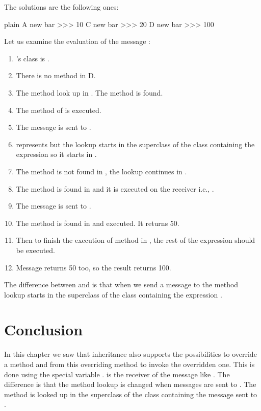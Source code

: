 \documentclass[10pt,twoside,english]{_support/latex/sbabook/sbabook}
\begin{document}
The solutions are the following ones:

\begin{displaycode}{plain}
A new bar
>>> 10
C new bar
>>> 20
D new bar
>>> 100
\end{displaycode}

Let us examine the evaluation of the message : 

\begin{enumerate}
\item {}'s class is .
\item There is no method  in D.
\item The method look up in . The method  is found.
\item The method  of  is executed.
\item The message  is sent to .
\item {} represents  but the lookup starts in the superclass of the class containing the expression  so it starts in .
\item The method  is not found in , the lookup continues in .
\item The method  is found in  and it is executed on the receiver i.e., .
\item The message  is sent to .
\item The method  is found in  and executed. It returns 50. 
\item Then to finish the execution of method  in , the rest of the expression  should be executed.
\item Message  returns 50 too, so the result returns 100. 
\end{enumerate}

\begin{important}
The difference between  and  is that when we send a message to  the method lookup starts in the superclass of the class containing the expression .
\end{important}
\section{Conclusion}
In this chapter we saw that inheritance also supports the possibilities to override a method and from this overriding method to invoke the overridden one. This is done using the special variable . 
 is the receiver of the message like . The difference is that the method lookup is changed when messages are sent to . The method is looked up in the superclass of the class containing the message sent to . 


\backmatter



\end{document}
